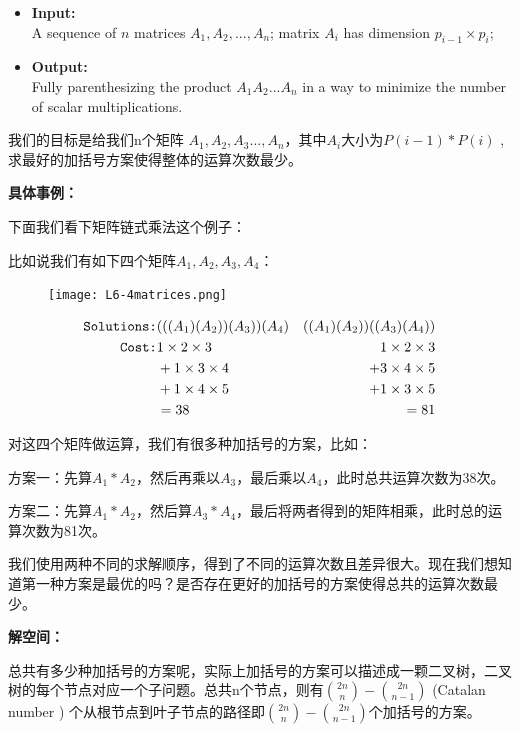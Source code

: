 \begin{itemize}
    \item {\bf Input:}\\  A sequence of $n$ matrices $A_1, A_2, ..., A_n$; matrix $A_i$ has dimension $p_{i-1}\times p_i$;
	\item {\bf Output:}\\  Fully parenthesizing the product $A_1 A_2 ... A_n$ in a way to minimize the number of scalar multiplications.
\end{itemize}

我们的目标是给我们n个矩阵 $A_1,A_2,A_3...,A_n$，其中$A_i$大小为$P(i-1)*P(i)$ ,求最好的加括号方案使得整体的运算次数最少。

\textbf{具体事例：}

下面我们看下矩阵链式乘法这个例子：

比如说我们有如下四个矩阵$A_1,A_2,A_3,A_4$：
\newpage
\begin{figure}
 \centering
 \texttt{[image: L6-4matrices.png]}
\end{figure}

\begin{eqnarray}
\text{\tt Solutions:} &    ( ( (A_1) (A_2) )  (A_3 ) )  ( A_4 )  &  (  ( A_1 )  (A_2 ) ) ( ( A_3 ) ( A_4 ) ) \nonumber \\
\text{\tt Cost:} &  1\times 2 \times 3  &  1  \times 2  \times 3   \nonumber \\
& +  1 \times 3 \times 4  & + 3 \times 4 \times 5 \nonumber  \\
& +  1 \times 4 \times 5  & + 1 \times 3 \times 5  \nonumber \\
& = 38 & =81 \nonumber
\end{eqnarray}

对这四个矩阵做运算，我们有很多种加括号的方案，比如：

方案一：先算$A_1*A_2$，然后再乘以$A_3$，最后乘以$A_4$，此时总共运算次数为38次。

方案二：先算$A_1*A_2$，然后算$A_3*A_4$，最后将两者得到的矩阵相乘，此时总的运算次数为81次。

我们使用两种不同的求解顺序，得到了不同的运算次数且差异很大。现在我们想知道第一种方案是最优的吗？是否存在更好的加括号的方案使得总共的运算次数最少。

\textbf{解空间：}

总共有多少种加括号的方案呢，实际上加括号的方案可以描述成一颗二叉树，二叉树的每个节点对应一个子问题。总共n个节点，则有${ 2n \choose n } - { 2n \choose n-1}$ (Catalan number ) 个从根节点到叶子节点的路径即${ 2n \choose n } - { 2n \choose n-1}$个加括号的方案。

